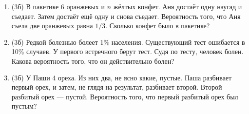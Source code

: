 \documentclass[a4paper, 12pt]{article}
\begin{document}
\begin{enumerate}[resume]
\item (3б) В пакетике 6 оранжевых и $n$ жёлтых конфет. Аня достаёт одну наугад и съедает. Затем достаёт ещё одну и снова съедает. Вероятность того, что Аня съела две оранжевых равна $1/3$. Сколько конфет было в пакетике?
\item (3б) Редкой болезнью болеет 1\% населения. Существующий тест ошибается в 10\% случаев. У первого встречного берут тест. Судя по тесту, человек болен. Какова вероятность того, что он действительно болен?
\item (3б) У Паши 4 ореха. Из них два, не ясно какие, пустые. Паша разбивает первый орех, и затем, не глядя на результат, разбивает второй. Второй разбитый орех — пустой. Вероятность того, что первый разбитый орех был пустым?
\end{enumerate}
\end{document}
